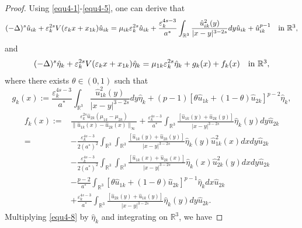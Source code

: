 \documentclass[reqno, 11pt]{amsart} %
\numberwithin{equation}{section}
\begin{document}
	\begin{proof}
		Using \eqref{equ4-1}-\eqref{equ4-5}, one can derive that
		\begin{equation}\label{equ4-7}
			(-\Delta)^{s} \hat{u}_{ik}+\varepsilon_{k}^{2s}V(\varepsilon_{k}x+x_{1k})\hat{u}_{ik}=\mu_{ik}\varepsilon_{k}^{2s}\hat{u}_{ik}+\frac{\varepsilon_{k}^{4s-3}}{a^{\ast}}\int_{\mathbb{R}^{3}}\frac{\hat{u}_{ik}^{2}(y)}{|x-y|^{3-2s}}dy\hat{u}_{ik}+\hat{u}_{ik}^{p-1}\quad \hbox{in $\mathbb{R}^{3}$},
		\end{equation}
		and
		\begin{equation}\label{equ4-8}
			(-\Delta)^{s}\hat{\eta}_{k}+\varepsilon_{k}^{2s}V(\varepsilon_{k}x+x_{1k})\hat{\eta}_{k}=\mu_{1k}\varepsilon_{k}^{2s}\hat{\eta}_{k}+g_{k}(x)+f_{k}(x) \quad\hbox{in $\mathbb{R}^3$},
		\end{equation}
		where there exists $\theta\in(0, 1)$ such that
		\begin{equation}\label{equ4-9}
			g_{k}(x):=\frac{\varepsilon_{k}^{4s-3}}{a^{\ast}}\int_{\mathbb{R}^{3}}\frac{\hat{u}_{1k}^{2}(y)}{|x-y|^{3-2s}}dy\hat{\eta}_{k}+(p-1)[\theta\hat{u}_{1k}+(1-\theta)\hat{u}_{2k}]^{p-2}\hat{\eta}_{k},
		\end{equation}
		\begin{equation}\label{equ4-10}
			\begin{split}
				f_{k}(x):=&\frac{\varepsilon_{k}^{2s}\hat{u}_{2k}(\mu_{1k}-\mu_{2k})}{\|\hat{u}_{1k}(x)-	\hat{u}_{2k}(x)\|_{\infty}}+\frac{\varepsilon_{k}^{4s-3}}{a^{\ast}}\int_{\mathbb{R}^{3}}\frac{[\hat{u}_{1k}(y)+\hat{u}_{2k}(y)]}{|x-y|^{3-2s}}\hat{\eta}_{k}(y)dy\hat{u}_{2k}\\
				=&-\frac{\varepsilon_{k}^{4s-3}}{2(a^{\ast})^{2}}\int_{\mathbb{R}^{3}}\int_{\mathbb{R}^{3}}\frac{[\hat{u}_{1k}(y)+\hat{u}_{2k}(y)]}{|x-y|^{3-2s}}\hat{\eta}_{k}(y)\hat{u}^{2}_{1k}(x)dxdy\hat{u}_{2k}\\
				&-\frac{\varepsilon_{k}^{4s-3}}{2(a^{\ast})^{2}}\int_{\mathbb{R}^{3}}\int_{\mathbb{R}^{3}}\frac{[\hat{u}_{1k}(x)+\hat{u}_{2k}(x)]}{|x-y|^{3-2s}}\hat{\eta}_{k}(x)\hat{u}^{2}_{2k}(y)dxdy\hat{u}_{2k}\\
				&-\frac{p-2}{a^{\ast}}\int_{\mathbb{R}^{3}}[\theta\hat{u}_{1k}+(1-\theta)\hat{u}_{2k}]^{p-1}\hat{\eta}_{k}dx\hat{u}_{2k}\\
				&+\frac{\varepsilon_{k}^{4s-3}}{a^{\ast}}\int_{\mathbb{R}^{3}}\frac{[\hat{u}_{2k}(y)+\hat{u}_{1k}(y)]}{|x-y|^{3-2s}}\hat{\eta}_{k}(y)dy\hat{u}_{2k}.
			\end{split}
		\end{equation}
		Multiplying \eqref{equ4-8} by $\hat{\eta}_{k}$ and integrating on $\mathbb{R}^{3}$, we have

\end{proof}
\end{document}
